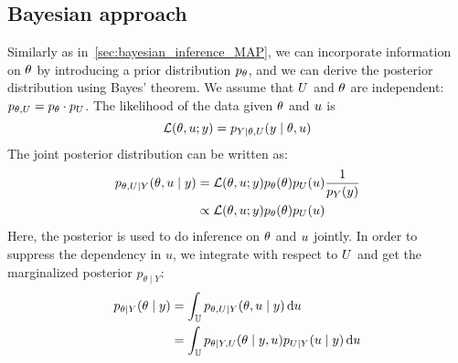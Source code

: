 \documentclass[../../Main_ManuscritThese.tex]{subfiles}
\begin{document}
\subsection{Bayesian approach}
Similarly as in~\cref{sec:bayesian_inference_MAP}, we can incorporate information on $\theta$ by introducing a prior distribution $p_{\theta}$, and we can derive the posterior distribution using Bayes' theorem. We assume that $U$ and $\theta$ are independent: $p_{\theta, U} = p_{\theta}\cdot p_{U}$.
The likelihood of the data given $\theta$ and $u$ is
\begin{equation}
  \mathcal{L}(\theta,u;y) = p_{Y \mid \theta, U}(y\mid \theta,u)
\end{equation}
The joint posterior distribution can be written as:
\begin{align}
  p_{\theta,U \mid Y}(\theta,u \mid y) &= \mathcal{L}(\theta,u;y)p_{\theta}(\theta)p_{U}(u) \frac{1}{p_Y(y)} \\
  &\propto \mathcal{L}(\theta,u;y)p_{\theta}(\theta)p_{U}(u)
\end{align}
Here, the posterior is used to do inference on $\theta$ and $u$ jointly. In order to suppress the dependency in $u$, we integrate with respect to $U$ and get the marginalized posterior $p_{\theta \mid Y}$:
\begin{align}
  p_{\theta \mid Y}(\theta \mid y) &= \int_{\mathbb{U}} p_{\theta,U\mid Y}(\theta,u\mid y)\,\mathrm{d}u \label{eq:marg_MMAP}\\
                             &= \int_{\mathbb{U}}p_{\theta \mid Y, U}(\theta \mid y, u) p_{U\mid Y}(u \mid y)\,\mathrm{d}u
\end{align}
\end{document}
